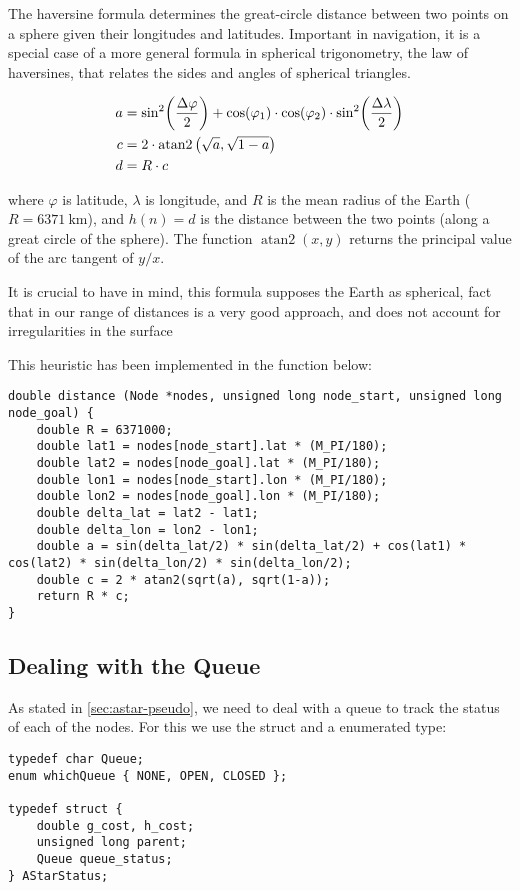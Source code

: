 The haversine formula determines the great-circle distance between two points on a sphere given their longitudes and latitudes. Important in navigation, it is a special case of a more general formula in spherical trigonometry, the law of haversines, that relates the sides and angles of spherical triangles.

\begin{align}
    a &= \sin[2](\frac{\Delta \varphi}{2}) + \cos (\varphi_1) \cdot \cos(\varphi_2) \cdot \sin[2](\frac{\Delta \lambda}{2})\notag \\
    c &= 2 \cdot \operatorname{atan2}\qty(\sqrt{a}, \sqrt{1-a}) \notag \\
    d &=  R \cdot c
\end{align}

where $\varphi$ is latitude, $\lambda$ is longitude, and $R$ is the mean radius of the Earth ($R = \SI{6371}{\km}$), and $h(n) = d$ is the distance between the two points (along a great circle of the sphere). The function $\operatorname{atan2}(x,y)$ returns the principal value of the arc tangent of $y/x$.

It is crucial to have in mind, this formula supposes the Earth as spherical, fact that in our range of
distances is a very good approach, and does not account for irregularities in the surface

\bigskip
This heuristic has been implemented in the  function below:
\begin{lstlisting}
double distance (Node *nodes, unsigned long node_start, unsigned long node_goal) {
	double R = 6371000;
	double lat1 = nodes[node_start].lat * (M_PI/180);
	double lat2 = nodes[node_goal].lat * (M_PI/180);
	double lon1 = nodes[node_start].lon * (M_PI/180);
	double lon2 = nodes[node_goal].lon * (M_PI/180);
	double delta_lat = lat2 - lat1;
	double delta_lon = lon2 - lon1;
	double a = sin(delta_lat/2) * sin(delta_lat/2) + cos(lat1) * cos(lat2) * sin(delta_lon/2) * sin(delta_lon/2);
	double c = 2 * atan2(sqrt(a), sqrt(1-a));
	return R * c;
}
\end{lstlisting}

\subsection{Dealing with the Queue}
As stated in \cref{sec:astar-pseudo}, we need to deal with a queue to track the status of each of the nodes. For this we use the  struct and a  enumerated type:
\begin{lstlisting}
typedef char Queue;
enum whichQueue { NONE, OPEN, CLOSED };

typedef struct {
	double g_cost, h_cost;
	unsigned long parent;
	Queue queue_status;
} AStarStatus;
\end{lstlisting}

